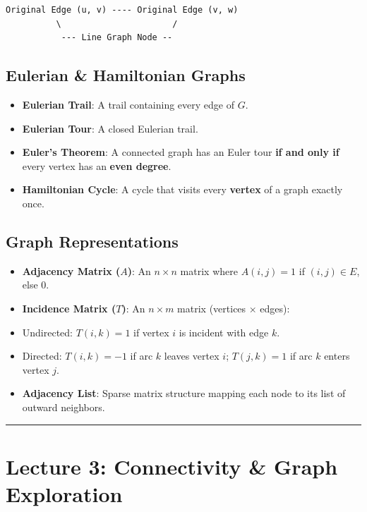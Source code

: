 \documentclass[
]{book}
\theoremstyle{definition}
\theoremstyle{definition}
\theoremstyle{definition}
\theoremstyle{definition}
\theoremstyle{remark}
\begin{document}
\begin{verbatim}
Original Edge (u, v) ---- Original Edge (v, w)
          \                      /
           --- Line Graph Node --
\end{verbatim}

\subsection{Eulerian \& Hamiltonian Graphs}\label{eulerian-hamiltonian-graphs}

\begin{itemize}
\item
  \textbf{Eulerian Trail}: A trail containing every edge of \(G\).
\item
  \textbf{Eulerian Tour}: A closed Eulerian trail.
\item
  \textbf{Euler's Theorem}: A connected graph has an Euler tour \textbf{if and only if} every vertex has an \textbf{even degree}.
\item
  \textbf{Hamiltonian Cycle}: A cycle that visits every \textbf{vertex} of a graph exactly once.
\end{itemize}

\subsection{Graph Representations}\label{graph-representations}

\begin{itemize}
\item
  \textbf{Adjacency Matrix (\(A\))}: An \(n \times n\) matrix where \(A(i, j) = 1\) if \((i, j) \in E\), else \(0\).
\item
  \textbf{Incidence Matrix (\(T\))}: An \(n \times m\) matrix (vertices \(\times\) edges):
\item
  Undirected: \(T(i, k) = 1\) if vertex \(i\) is incident with edge \(k\).
\item
  Directed: \(T(i, k) = -1\) if arc \(k\) leaves vertex \(i\); \(T(j, k) = 1\) if arc \(k\) enters vertex \(j\).
\item
  \textbf{Adjacency List}: Sparse matrix structure mapping each node to its list of outward neighbors.
\end{itemize}

\begin{center}\rule{0.5\linewidth}{0.5pt}\end{center}

\section{Lecture 3: Connectivity \& Graph Exploration}\label{lecture-3-connectivity-graph-exploration}
\end{document}
